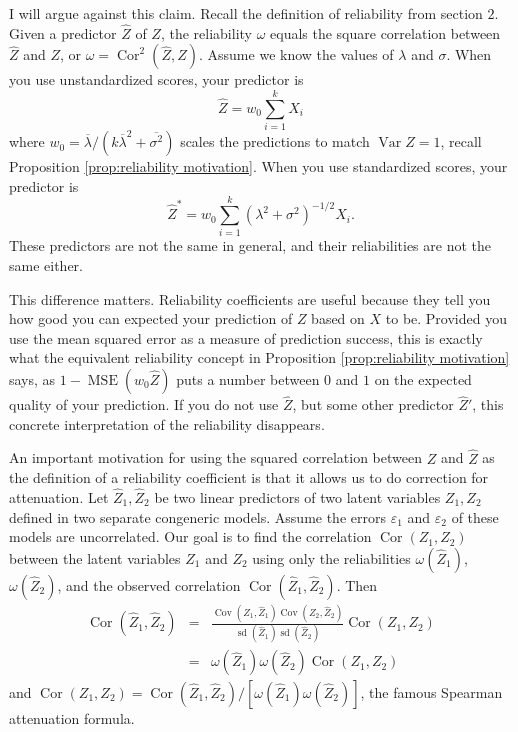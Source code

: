 \documentclass[twoside]{article}
\DeclareMathOperator{\Var}{Var}
\DeclareMathOperator{\sd}{sd}
\DeclareMathOperator{\Cor}{Cor}
\DeclareMathOperator{\Cov}{Cov}
\DeclareMathOperator{\MSE}{MSE}
\begin{document}
I will argue against this claim. Recall the definition of reliability from
section $2$. Given a predictor $\hat{Z}$ of $Z$, the
reliability $\omega$ equals the square correlation between $\hat{Z}$
and $Z$, or $\omega=\Cor^{2}(\hat{Z},Z)$. Assume
we know the values of $\lambda$ and $\sigma$. When you use unstandardized
scores, your predictor is $$\hat{Z}=w_{0}\sum_{i=1}^{k}X_{i}$$
where $w_{0}=\overline{\lambda}/(k\overline{\lambda}^{2}+\overline{\sigma^{2}})$ scales the predictions to match $\Var Z=1$, recall Proposition \ref{prop:reliability motivation}. When you use standardized
scores, your predictor is $$
\hat{Z}^{*}=w_{0}\sum_{i=1}^{k}(\lambda^{2}+\sigma^{2})^{-1/2}X_{i}.$$
These predictors are not the same in general, and their reliabilities are not
the same either.

This difference matters. Reliability coefficients are useful because they tell you how good you can expected your prediction of $Z$ based on $X$ to be. Provided you use the mean squared error as a measure of prediction success, this is exactly what the equivalent reliability concept in Proposition \ref{prop:reliability motivation} says, as $1 - \MSE(w_0\hat{Z})$ puts a number between $0$ and $1$ on the expected quality of your prediction. If you do not use $\hat{Z}$, but some other predictor $\hat{Z}'$, this concrete interpretation of the reliability disappears. 

An important motivation for using the squared
correlation between $Z$ and $\hat{Z}$ as the definition of a
reliability coefficient is that it allows us to do correction for
attenuation. Let $\hat{Z}_{1},\hat{Z}_{2}$ be two linear
predictors of two latent variables $Z_{1},Z_{2}$ defined in two separate
congeneric models. Assume the errors $\varepsilon_{1}$ and $\varepsilon_{2}$ of these models
are uncorrelated. Our goal is to find the correlation $\Cor(Z_{1},Z_{2})$
between the latent variables $Z_{1}$ and $Z_{2}$ using only the
reliabilities $\omega(\hat{Z}_{1})$, $\omega(\hat{Z}_{2})$,
and the observed correlation $\Cor(\hat{Z}_{1},\hat{Z}_{2})$.
Then
\begin{eqnarray*}
\Cor(\hat{Z}_{1},\hat{Z}_{2}) & = & \frac{\Cov(Z_{1},\hat{Z}_{1})\Cov(Z_{2},\hat{Z}_{2})}{\sd(\hat{Z}_{1})\sd(\hat{Z}_{2})}\Cor(Z_{1},Z_{2})\\
 & = & \omega(\hat{Z}_{1})\omega(\hat{Z}_{2})\Cor(Z_{1},Z_{2})
\end{eqnarray*}
and $\Cor(Z_{1},Z_{2})=\Cor(\hat{Z}_{1},\hat{Z}_{2})/[\omega(\hat{Z}_{1})\omega(\hat{Z}_{2})]$,
the famous Spearman \citet{spearman1904proof} attenuation formula.
\end{document}
